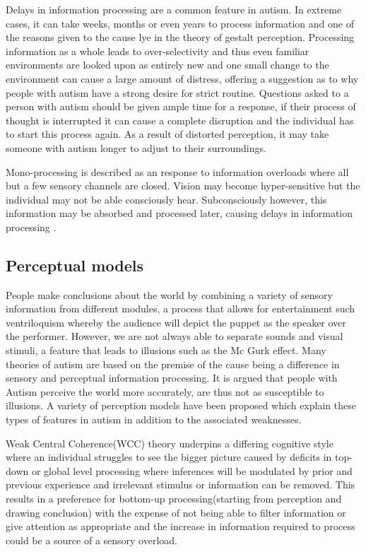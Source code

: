 \documentclass[11pt]{report}
\begin{document}
Delays in information processing are a common feature in autism. In extreme cases, it can take weeks, months or even years to process information and one of the reasons given to the cause lye in the theory of gestalt perception. Processing information as a whole leads to over-selectivity and thus even familiar environments are looked upon as entirely new and one small change to the environment can cause a large amount of distress\cite{olgab}, offering a suggestion as to why people with autism have a strong desire for strict routine. Questions asked to a person with autism should be given ample time for a response, if their process of thought is interrupted it can cause a complete disruption and the individual has to start this process again\cite{olgab}. As a result of distorted perception, it may take someone with autism longer to adjust to their surroundings.

Mono-processing is described as an response to information overloads where all but a few sensory channels are closed. Vision may become hyper-sensitive but the individual may not be able consciously hear. Subconsciously however, this information may be absorbed and processed later, causing delays in information processing \cite{olgab}.  

\subsection{Perceptual models}

People make conclusions about the world by combining a variety of sensory information from different modules, a process that allows for entertainment such ventriloquism whereby the audience will depict the puppet as the speaker over the performer. However, we are not always able to separate sounds and visual stimuli, a feature that leads to illusions such as the Mc Gurk effect. Many theories of autism are based on the premise of the cause being a difference in sensory and perceptual information processing. It is argued that people with Autism perceive the world more accurately, are thus not as susceptible to illusions. A variety of perception models have been proposed which explain these types of features in autism in addition to the associated weaknesses.  

Weak Central Coherence(WCC) theory underpins a differing cognitive style where an individual struggles to see the bigger picture caused by deficits in top-down or global level processing where inferences will be modulated by prior and previous experience and irrelevant stimulus or information can be removed. This results in a preference for bottom-up processing(starting from perception and drawing conclusion) with the expense of not being able to filter information or give attention as appropriate and the increase in information required to process could be a source of a sensory overload. 
\end{document}
